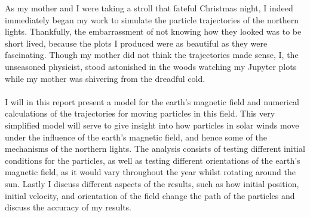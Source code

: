 As my mother and I were taking a stroll that fateful Christmas night, I indeed immediately began my work to simulate the particle trajectories of the northern lights. Thankfully, the embarrassment of not knowing how they looked was to be short lived, because the plots I produced were as beautiful as they were fascinating. Though my mother did not think the trajectories made sense, I, the unseasoned physicist, stood astonished in the woods watching my Jupyter plots while my mother was shivering from the dreadful cold.\\
\\
I will in this report present a model for the earth's magnetic field and numerical calculations of the trajectories for moving particles in this field. This very simplified model will serve to give insight into how particles in solar winds move under the influence of the earth's magnetic field, and hence some of the mechanisms of the northern lights. The analysis consists of testing different initial conditions for the particles, as well as testing different orientations of the earth's magnetic field, as it would vary throughout the year whilst rotating around the sun. Lastly I discuss different aspects of the results, such as how initial position, initial velocity, and orientation of the field change the path of the particles and discuss the accuracy of my results.